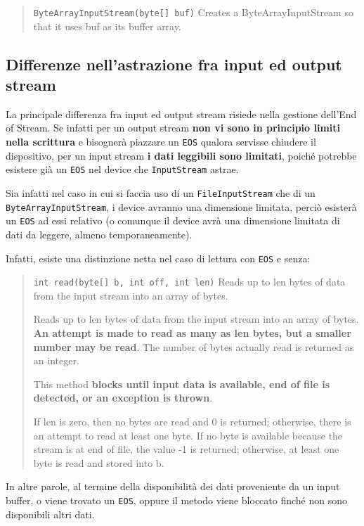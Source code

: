 \documentclass[\fontsizeclass,twocolumn]{\classname}
\theoremstyle{definition}
\theoremstyle{definition}
\begin{document}
\begin{quote}
    \footnotesize{\texttt{ByteArrayInputStream(byte[] buf)} 	Creates a
    ByteArrayInputStream so that it uses buf as its buffer array.}
\end{quote}

\subsection{Differenze nell'astrazione fra input ed output stream}

La principale differenza fra input ed output stream risiede nella gestione
dell'End of Stream. Se infatti per un output stream \textbf{non vi sono in
principio limiti nella scrittura} e bisognerà piazzare un \texttt{EOS} qualora servisse
chiudere il dispositivo, per un input stream \textbf{i dati leggibili sono
limitati}, poiché potrebbe esistere già un \texttt{EOS} nel device che
\texttt{Input\-Stream} astrae.

Sia infatti nel caso in cui si faccia uso di un \texttt{FileInputStream} che di
un \texttt{ByteArrayInputStream}, i device avranno una dimensione limitata,
perciò esisterà un \texttt{EOS} ad essi relativo (o comunque il device avrà una
dimensione limitata di dati da leggere, almeno temporaneamente).

Infatti, esiste una distinzione netta nel caso di lettura con \texttt{EOS} e senza:
\begin{quote}
    \footnotesize{\texttt{int 	read(byte[] b, int off, int len)} 	Reads up to
        len bytes of data from the input stream into an array of bytes.

Reads up to len bytes of data from the input stream into an array of bytes.
\textbf{An attempt is made to read as many as len bytes, but a smaller number
may be read}. The number of bytes actually read is returned as an integer.

This method \textbf{blocks until input data is available, end of file is
detected, or an exception is thrown}.

If len is zero, then no bytes are read and 0 is returned; otherwise, there is
an attempt to read at least one byte. If no byte is available because the
stream is at end of file, the value -1 is returned; otherwise, at least one
byte is read and stored into b.}
\end{quote}

In altre parole, al termine della disponibilità dei dati proveniente da un
input buffer, o viene trovato un \texttt{EOS}, oppure il metodo viene bloccato finché
non sono disponibili altri dati.
\end{document}
